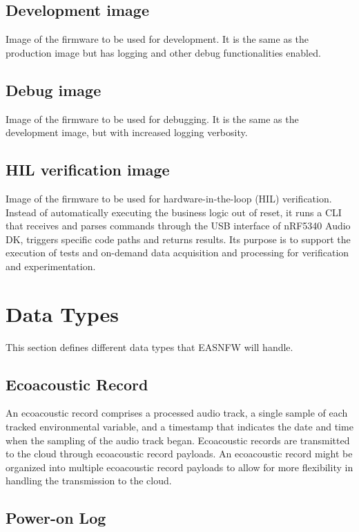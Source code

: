 \documentclass[11pt,a4paper]{article}
\begin{document}
\subsection{Development image}

Image of the firmware to be used for development. It is the same as the
production image but has logging and other debug functionalities enabled.

\subsection{Debug image}

Image of the firmware to be used for debugging. It is the same as the
development image, but with increased logging verbosity.

\subsection{HIL verification image}

Image of the firmware to be used for hardware-in-the-loop (HIL) verification.
Instead of automatically executing the business logic out of reset, it runs a
CLI that receives and parses commands through the USB interface of nRF5340 Audio
DK, triggers specific code paths and returns results. Its purpose is to support
the execution of tests and on-demand data acquisition and processing for
verification and experimentation.

\section{Data Types}\label{sec:data-types}

This section defines different data types that EASNFW will handle.

\subsection{Ecoacoustic Record}

An ecoacoustic record comprises a processed audio track, a single sample of each
tracked environmental variable, and a timestamp that indicates the date and time
when the sampling of the audio track began. Ecoacoustic records are transmitted
to the cloud through ecoacoustic record payloads. An ecoacoustic record might be
organized into multiple ecoacoustic record payloads to allow for more flexibility
in handling the transmission to the cloud.

\subsection{Power-on Log}
\end{document}

